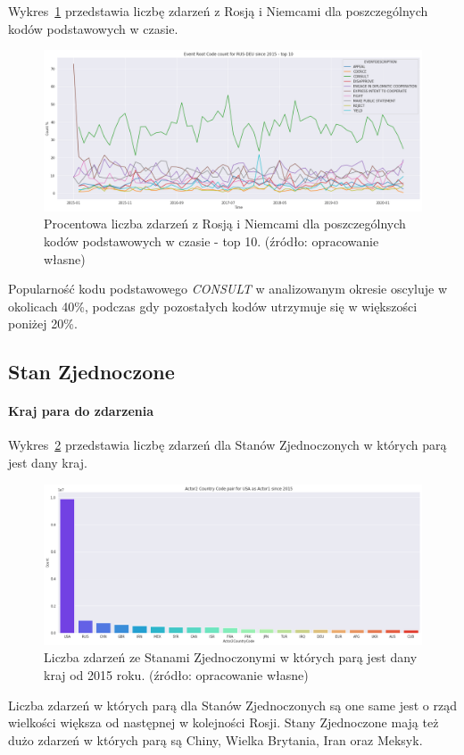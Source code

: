 \documentclass[11pt]{report}
\begin{document}
    Wykres~\ref{fig:RUSRUSERC} przedstawia liczbę zdarzeń z Rosją i Niemcami dla poszczególnych kodów podstawowych w czasie.
    \begin{figure}[!htp]
        \centering
        \includegraphics[width=\linewidth]{fig/RUS/RUSDEUERCperc.png}
        \caption{Procentowa liczba zdarzeń z Rosją i Niemcami dla poszczególnych kodów podstawowych w czasie - top 10. (źródło: opracowanie własne)}
        \label{fig:RUSRUSERC}
    \end{figure}
    Popularność kodu podstawowego \textit{CONSULT} w analizowanym okresie oscyluje w okolicach 40\%, podczas gdy pozostałych kodów utrzymuje się w większości poniżej 20\%.

    \subsection{Stan Zjednoczone}

    \paragraph{Kraj para do zdarzenia}

    Wykres~\ref{fig:USApair} przedstawia liczbę zdarzeń dla Stanów Zjednoczonych w których parą jest dany kraj.

    \begin{figure}[!htp]
        \centering
        \includegraphics[width=\linewidth]{fig/USA/USAactor2Pair.png}
        \caption{Liczba zdarzeń ze Stanami Zjednoczonymi w których parą jest dany kraj od 2015 roku. (źródło: opracowanie własne)}
        \label{fig:USApair}
    \end{figure}
    Liczba zdarzeń w których parą dla Stanów Zjednoczonych są one same jest o rząd wielkości większa od następnej w kolejności Rosji.
    Stany Zjednoczone mają też dużo zdarzeń w których parą są Chiny, Wielka Brytania, Iran oraz Meksyk.
\end{document}
